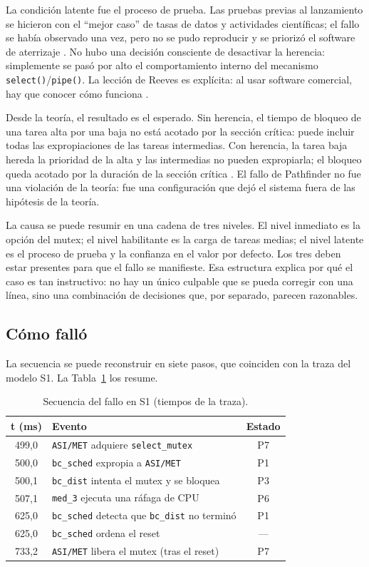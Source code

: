 \documentclass[journal]{IEEEtran}
\begin{document}
La condición latente fue el proceso de prueba. Las pruebas previas al lanzamiento se hicieron con el ``mejor caso'' de tasas de datos y actividades científicas; el fallo se había observado una vez, pero no se pudo reproducir y se priorizó el software de aterrizaje \cite{reeves1997mars}. No hubo una decisión consciente de desactivar la herencia: simplemente se pasó por alto el comportamiento interno del mecanismo \texttt{select()}/\texttt{pipe()}. La lección de Reeves es explícita: al usar software comercial, hay que conocer cómo funciona \cite{reeves1997mars}.

Desde la teoría, el resultado es el esperado. Sin herencia, el tiempo de bloqueo de una tarea alta por una baja no está acotado por la sección crítica: puede incluir todas las expropiaciones de las tareas intermedias. Con herencia, la tarea baja hereda la prioridad de la alta y las intermedias no pueden expropiarla; el bloqueo queda acotado por la duración de la sección crítica \cite{sha1990priority}. El fallo de Pathfinder no fue una violación de la teoría: fue una configuración que dejó el sistema fuera de las hipótesis de la teoría.

La causa se puede resumir en una cadena de tres niveles. El nivel inmediato es la opción del mutex; el nivel habilitante es la carga de tareas medias; el nivel latente es el proceso de prueba y la confianza en el valor por defecto. Los tres deben estar presentes para que el fallo se manifieste. Esa estructura explica por qué el caso es tan instructivo: no hay un único culpable que se pueda corregir con una línea, sino una combinación de decisiones que, por separado, parecen razonables.

\subsection{Cómo falló}
\label{sec:como}

La secuencia se puede reconstruir en siete pasos, que coinciden con la traza del modelo S1. La Tabla~\ref{tab:secuencia} los resume.

\begin{table}[t]
\caption{Secuencia del fallo en S1 (tiempos de la traza).}
\label{tab:secuencia}
\centering
\footnotesize
\begin{tabular}{c p{4.2cm} c}
\toprule
\textbf{t (ms)} & \textbf{Evento} & \textbf{Estado} \\
\midrule
499,0 & \texttt{ASI/MET} adquiere \texttt{select\_mutex} & P7 \\
500,0 & \texttt{bc\_sched} expropia a \texttt{ASI/MET} & P1 \\
500,1 & \texttt{bc\_dist} intenta el mutex y se bloquea & P3 \\
507,1 & \texttt{med\_3} ejecuta una ráfaga de CPU & P6 \\
625,0 & \texttt{bc\_sched} detecta que \texttt{bc\_dist} no terminó & P1 \\
625,0 & \texttt{bc\_sched} ordena el reset & --- \\
733,2 & \texttt{ASI/MET} libera el mutex (tras el reset) & P7 \\
\bottomrule
\end{tabular}
\end{table}
\end{document}
